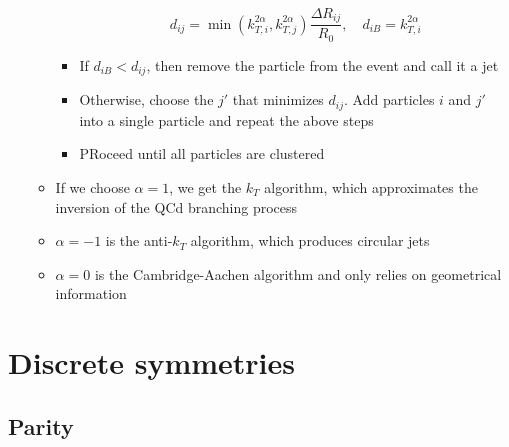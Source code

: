 \begin{itemize}
\begin{itemize}
\begin{itemize}
\begin{equation}
        d_{ij} = \min \left(k_{T,i}^{2\alpha},k_{T,j}^{2\alpha}\right) \frac{\Delta R_{ij}}{R_0}, \quad d_{iB} = k_{T,i}^{2\alpha}
      \end{equation}
      \item If $d_{iB} < d_{ij}$, then remove the particle from the event and call it a jet
      \item Otherwise, choose the $j'$ that minimizes $d_{ij}$. Add particles $i$ and $j'$ into a single particle and repeat the above steps
      \item PRoceed until all particles are clustered
    \end{itemize}
    \item If we choose $\alpha=1$, we get the $k_T$ algorithm, which approximates the inversion of the QCd branching process
    \item $\alpha = -1$ is the anti-$k_T$ algorithm, which produces circular jets
    \item $\alpha = 0$ is the Cambridge-Aachen algorithm and only relies on geometrical information
  \end{itemize}
\end{itemize}

\section{Discrete symmetries}
\subsection{Parity}

